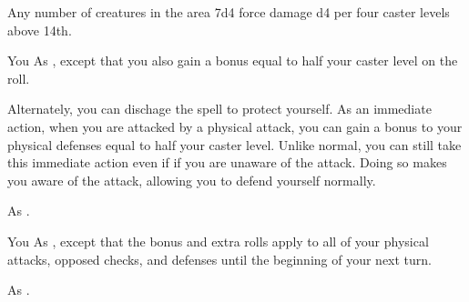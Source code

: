\begin{spellheader}
\end{spellheader}
\begin{spelleffects}
    \begin{spelltargets}{Any number of creatures in the area}
        \spelleffect 7d4 force damage \add d4 per four caster levels above 14th.
    \end{spelltargets}
\end{spelleffects}
\begin{spellfooter}
    
\end{spellfooter}

\begin{spellheader}
\end{spellheader}
\begin{spelleffects}
    \begin{spelltarget}{You}
        \spelleffect As , except that you also gain a bonus equal to half your caster level on the roll.

        Alternately, you can dischage the spell to protect yourself. As an immediate action, when you are attacked by a physical attack, you can gain a bonus to your physical defenses equal to half your caster level. Unlike normal, you can still take this immediate action even if if you are unaware of the attack. Doing so makes you aware of the attack, allowing you to defend yourself normally.
    \end{spelltarget}
\end{spelleffects}
\begin{spellfooter}
    \spellnotes As .
\end{spellfooter}

\begin{spellheader}
\end{spellheader}
\begin{spelleffects}
    \begin{spelltarget}{You}
        \spelleffect As , except that the bonus and extra rolls apply to all of your physical attacks, opposed checks, and defenses until the beginning of your next turn.
    \end{spelltarget}
\end{spelleffects}
\begin{spellfooter}
    \spellnotes As .
\end{spellfooter}

